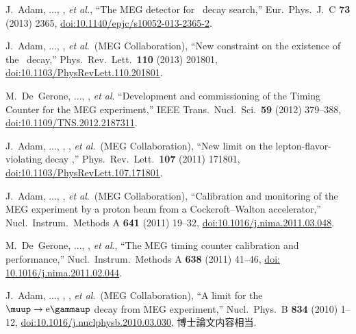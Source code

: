 \begin{enumerate}
  J.~Adam, ..., \me,  {\it et al.},
  ``The MEG detector for \megc\ decay search,''
  Eur.\ Phys.\ J.\ C {\bf 73} (2013) 2365,
  \href{https://doi.org/10.1140/epjc/s10052-013-2365-2}{doi:10.1140/epjc/s10052-013-2365-2}.

  J.~Adam, ..., \me,  {\it et al}.\ (MEG Collaboration),
  ``New constraint on the existence of the \megc\ decay,''
  Phys.\ Rev.\ Lett.\  {\bf 110} (2013) 201801,
  \href{https://doi.org/10.1103/PhysRevLett.110.201801}{doi:10.1103/PhysRevLett.110.201801}.


M.~De~Gerone, ..., \me, {\it et al}. %
``Development and commissioning of the Timing Counter for the MEG experiment,''
IEEE Trans.\ Nucl.\ Sci.\ \textbf{59} (2012) 379--388,
\href{http://dx.doi.org/10.1109/TNS.2012.2187311}{doi:10.1109/TNS.2012.2187311}.

J.~Adam, ..., \me, ,  {\it et al}.\ (MEG Collaboration),
``New limit on the lepton-flavor-violating decay \megc,''
Phys.\ Rev.\ Lett.\ \textbf{107} (2011) 171801,
\href{http://dx.doi.org/10.1103/PhysRevLett.107.171801}{doi:10.1103/PhysRevLett.107.171801}.

J.~Adam, ..., \me, {\it et al}.\ (MEG Collaboration),
``Calibration and monitoring of the MEG experiment by a proton beam from a Cockcroft--Walton accelerator,''
Nucl.\ Instrum.\ Methods A \textbf{641} (2011) 19--32,
\href{https://doi.org/10.1016/j.nima.2011.03.048}{doi:10.1016/j.nima.2011.03.048}.

M.~De~Gerone, ..., \me, {\it et al}., %
``The MEG timing counter calibration and performance,''
Nucl.\ Instrum.\ Methods A \textbf{638} (2011) 41--46,
\href{https://doi.org/10.1016/j.nima.2011.02.044}{doi: 10.1016/j.nima.2011.02.044}.

J.~Adam, ..., \me, ,  {\it et al}.\ (MEG Collaboration),
``A limit for the $\meg$ decay from MEG experiment,''
Nucl.\ Phys.\ B \textbf{834} (2010) 1--12,
\href{https://doi.org/10.1016/j.nuclphysb.2010.03.030}{doi:10.1016/j.nuclphysb.2010.03.030},
博士論文内容相当.


\end{enumerate}
